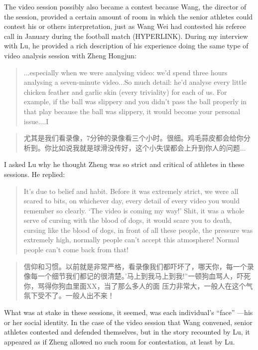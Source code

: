 \begin{CJK}{UTF8}{gbsn}
  The video session possibly also became a contest because Wang, the director of the session, provided a certain amount of room in which the senior athletes could contest his or others interpretation, just as Wang Wei had contested his referee call in January during the football match (HYPERLINK). During my interview with Lu, he provided a rich description of his experience doing the same type of video analysis session with Zheng Hongjun:

  \begin{quotation}
    ...especially when we were analysing video: we'd spend three hours analysing a seven-minute video...So much detail: he'd analyse every little chicken feather and garlic skin (every triviality) for each of us. For example, if the ball was slippery and you didn't pass the ball properly in that play because the ball was slippery, it would become your personal issue....I
  \end{quotation}


  \begin{quotation}
      尤其是我们看录像，7分钟的录像看三个小时。很细。鸡毛蒜皮都会给你分析到。你比如说我就是球滑没传好，这个小失误都会上升到你人的问题...
  \end{quotation}



I asked Lu why he thought Zheng was so strict and critical of athletes in these sessions.  He replied:

\begin{quotation}
    It's due to belief and habit. Before it was extremely strict, we were all scared to bits, on whichever day, every detail of every video you would remember so clearly. `The video is coming my way!'  Shit, it was a whole serve of cursing with the blood of dogs, it would scare you to death, cursing like the blood of dogs, in front of all these people, the pressure was extremely high, normally people can’t accept this atmosphere! Normal people can’t come back from that!
\end{quotation}


  \begin{quotation}
      信仰和习惯。以前就是非常严格，看录像我们都吓坏了，哪天你，每一个录像每一个细节我们都记的很清楚。'马上到我马上到我!''一顿狗血骂人，吓死你，骂得你狗血里面XX，当了那么多人的面 压力非常大，一般人在这个气氛下受不了。一般人出不来！
  \end{quotation}


What was at stake in these sessions, it seemed, was each individual's ``face'' ---his or her social identity.  In the case of the video session that Wang convened, senior athletes contested and defended themselves, but in the story recounted by Lu, it appeared as if Zheng allowed no such room for contestation, at least by Lu.




\end{CJK}
